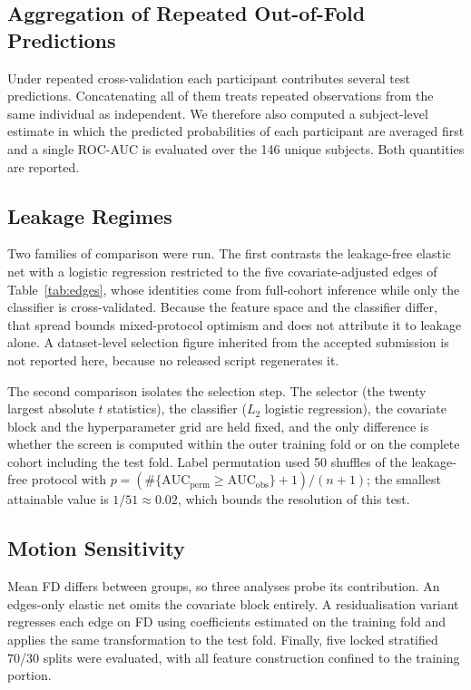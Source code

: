\documentclass[runningheads]{llncs}
\begin{document}
\subsection{Aggregation of Repeated Out-of-Fold Predictions}
Under repeated cross-validation each participant contributes several test predictions.
Concatenating all of them treats repeated observations from the same individual as
independent. We therefore also computed a subject-level estimate in which the predicted
probabilities of each participant are averaged first and a single ROC-AUC is evaluated
over the 146 unique subjects. Both quantities are reported.

\subsection{Leakage Regimes}
Two families of comparison were run. The first contrasts the leakage-free elastic net
with a logistic regression restricted to the five covariate-adjusted edges of
Table~\ref{tab:edges}, whose identities come from full-cohort inference while only the
classifier is cross-validated. Because the feature space and the classifier differ, that
spread bounds mixed-protocol optimism and does not attribute it to leakage alone. A
dataset-level selection figure inherited from the accepted submission is not reported
here, because no released script regenerates it.

The second comparison isolates the selection step. The selector (the twenty largest
absolute $t$ statistics), the classifier ($L_2$ logistic regression), the covariate block
and the hyperparameter grid are held fixed, and the only difference is whether the screen
is computed within the outer training fold or on the complete cohort including the test
fold. Label permutation used 50 shuffles of the leakage-free protocol with
$p = (\#\{\mathrm{AUC}_{\mathrm{perm}} \geq \mathrm{AUC}_{\mathrm{obs}}\} + 1)/(n + 1)$;
the smallest attainable value is $1/51 \approx 0.02$, which bounds the resolution of this
test.

\subsection{Motion Sensitivity}
Mean FD differs between groups, so three analyses probe its contribution. An edges-only
elastic net omits the covariate block entirely. A residualisation variant regresses each
edge on FD using coefficients estimated on the training fold and applies the same
transformation to the test fold. Finally, five locked stratified 70/30 splits were
evaluated, with all feature construction confined to the training portion.
\end{document}
